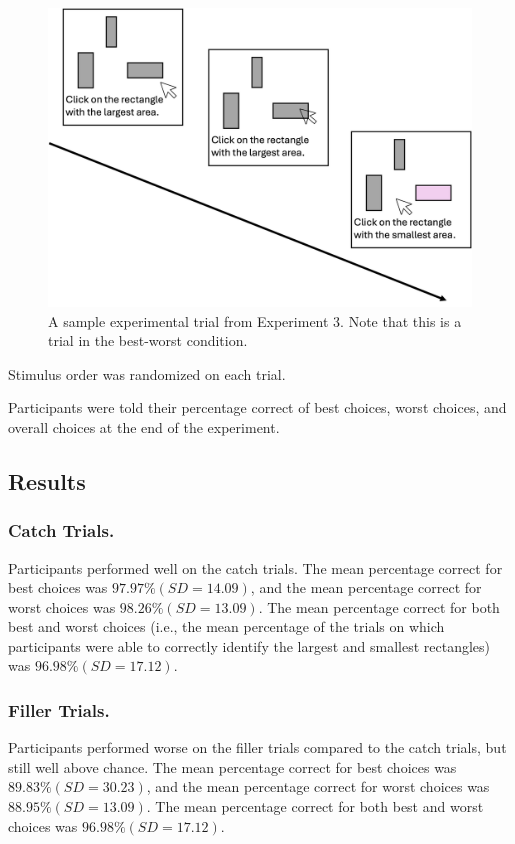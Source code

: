 \begin{figure}
   \includegraphics[width=\linewidth]{figures/bw_design_fig.jpg}
   \caption{A sample experimental trial from Experiment 3. Note that this is a trial in the best-worst condition.}
   \label{fig:bw_example_trial}
 \end{figure}
 
Stimulus order was randomized on each trial. 

Participants were told their percentage correct of best choices, worst choices, and overall choices at the end of the experiment.

\subsection{Results}


\subsubsection{Catch Trials.}
Participants performed well on the catch trials. The mean percentage correct for best choices was $97.97\% (SD=14.09)$, and the mean percentage correct for worst choices was $98.26\% (SD=13.09)$. The mean percentage correct for both best and worst choices (i.e., the mean percentage of the trials on which participants were able to correctly identify the largest and smallest rectangles) was $96.98\% (SD=17.12)$. 

\subsubsection{Filler Trials.}
Participants performed worse on the filler trials compared to the catch trials, but still well above chance. The mean percentage correct for best choices was $89.83\% (SD=30.23)$, and the mean percentage correct for worst choices was $88.95\% (SD=13.09)$. The mean percentage correct for both best and worst choices was $96.98\% (SD=17.12)$. 

